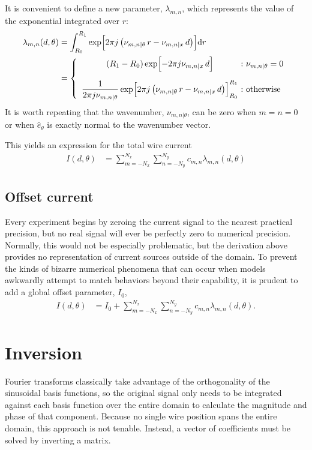\documentclass{article}
\def\d{\mathrm{d}}
\def\eth{\hat{e}_\theta}
\def\nuth{\nu_{m,n|\theta}}
\begin{document}
It is convenient to define a new parameter, $\lambda_{m,n}$, which represents the value of the exponential integrated over $r$:
\begin{align}
\lambda_{m,n}(d,\theta) &= \int_{R_0}^{R_1} \exp\Bigl[2\pi j \left(\nuth\,r - \nu_{m,n|x}\,d\right)\Bigr] \d r \nonumber\\
 &= \left\{\begin{array}{c@{\ :\ }l}
 \displaystyle (R_1 - R_0) \exp\Bigl[-2\pi j \nu_{m,n|x}\,d\Bigr] & \nuth = 0  \vspace{1.0em} \\
\displaystyle \frac{1}{2\pi j \nuth}\exp\Bigl[2\pi j \left(\nuth\,r - \nu_{m,n|x}\,d\right)\Bigr]^{R_1}_{R_0} & \mathrm{otherwise}
\end{array}
\right.
\end{align}
It is worth repeating that the wavenumber, $\nuth$, can be zero when $m=n=0$ or when $\eth$ is exactly normal to the wavenumber vector.

This yields an expression for the total wire current
\begin{align}
I(d,\theta) &= \sum_{m=-N_x}^{N_x} \sum_{n=-N_y}^{N_y} c_{m,n} \lambda_{m,n}(d,\theta)
\end{align}

\subsection{Offset current}

Every experiment begins by zeroing the current signal to the nearest practical precision, but no real signal will ever be perfectly zero to numerical precision.  Normally, this would not be especially problematic, but the derivation above provides no representation of current sources outside of the domain.  To prevent the kinds of bizarre numerical phenomena that can occur when models awkwardly attempt to match behaviors beyond their capability, it is prudent to add a global offset parameter, $I_0$,  
\begin{align}
I(d,\theta) &= I_0 + \sum_{m=-N_x}^{N_x} \sum_{n=-N_y}^{N_y} c_{m,n} \lambda_{m,n}(d,\theta)\label{eqn:I}.
\end{align}

\section{Inversion}

Fourier transforms classically take advantage of the orthogonality of the sinusoidal basis functions, so the original signal only needs to be integrated against each basis function over the entire domain to calculate the magnitude and phase of that component.  Because no single wire position spans the entire domain, this approach is not tenable.  Instead, a vector of coefficients must be solved by inverting a matrix.
\end{document}
